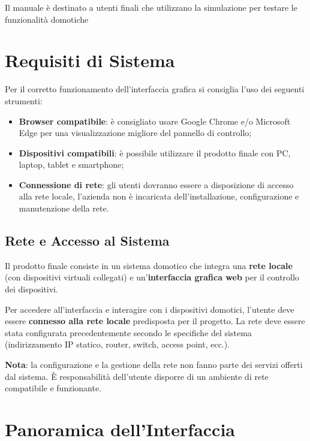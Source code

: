 \documentclass[a4paper,12pt]{article}
\begin{document}
Il manuale è destinato a utenti finali che utilizzano la simulazione per testare le funzionalità domotiche

\section{Requisiti di Sistema}

Per il corretto funzionamento dell’interfaccia grafica si consiglia l’uso dei seguenti strumenti:

\begin{itemize}
  \item \textbf{Browser compatibile}: è consigliato usare Google Chrome e/o Microsoft Edge per una visualizzazione migliore del pannello di controllo;
  \item \textbf{Dispositivi compatibili}: è possibile utilizzare il prodotto finale con PC, laptop, tablet e smartphone;
  \item \textbf{Connessione di rete}: gli utenti dovranno essere a disposizione di accesso alla rete locale, l'azienda non è incaricata dell'installazione, configurazione e manutenzione della rete.
\end{itemize}

\subsection{ Rete e Accesso al Sistema}

Il prodotto finale consiste in un sistema domotico che integra una \textbf{rete locale} (con dispositivi virtuali collegati) e un’\textbf{interfaccia grafica web} per il controllo dei dispositivi.

Per accedere all’interfaccia e interagire con i dispositivi domotici, l’utente deve essere \textbf{connesso alla rete locale} predisposta per il progetto. La rete deve essere stata configurata precedentemente secondo le specifiche del sistema (indirizzamento IP statico, router, switch, access point, ecc.).

\textbf{Nota}: la configurazione e la gestione della rete non fanno parte dei servizi offerti dal sistema. È responsabilità dell’utente disporre di un ambiente di rete compatibile e funzionante.

\hspace{20 mm}

\section{Panoramica dell’Interfaccia}
\end{document}
